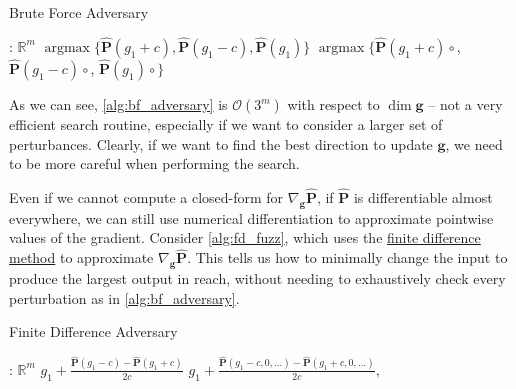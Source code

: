 \begin{algorithm}[H]
\caption{Brute Force Adversary}
\label{alg:bf_adversary}
\begin{algorithmic}[1]
: $\mathbb{R}^m$
 
\State \Return $\operatorname{argmax}\{\mathbf{\hat P}(g_1 + c), \mathbf{\hat P}(g_1 - c), \mathbf{\hat P}(g_1)\}$
\Else {}
\State \Return $\operatorname{argmax}\{\mathbf{\hat P}(g_1 + c) \circ$,\newline
\hspace*{10em} $\mathbf{\hat P}(g_1 - c)\circ$,\newline
\hspace*{10em} $\mathbf{\hat P}(g_1)\circ$$\}$
\EndIf
\EndProcedure
\end{algorithmic}
\end{algorithm}

As we can see, \autoref{alg:bf_adversary} is $\mathcal{O}(3^m)$ with respect to $\dim \mathbf g$ -- not a very efficient search routine, especially if we want to consider a larger set of perturbances. Clearly, if we want to find the best direction to update $\mathbf g$, we need to be more careful when performing the search.

Even if we cannot compute a closed-form for $\nabla_{\mathbf g}\mathbf{\hat P}$, if $\mathbf{\hat P}$ is differentiable almost everywhere, we can still use numerical differentiation to approximate pointwise values of the gradient. Consider \autoref{alg:fd_fuzz}, which uses the \hyperref[sec:fdm]{finite difference method} to approximate $\nabla_{\mathbf g}\mathbf{\hat P}$. This tells us how to minimally change the input to produce the largest output in reach, without needing to exhaustively check every perturbation as in \autoref{alg:bf_adversary}.

\begin{algorithm}[H]
\caption{Finite Difference Adversary}
\label{alg:fd_fuzz}
\begin{algorithmic}[1]
: $\mathbb{R}^m$
 
\State \Return $g_1 + \frac{\mathbf{\hat P}(g_1 - c) - \mathbf{\hat P}(g_1 + c)}{2c}$
\Else {}
\State \Return $g_1 + \frac{\mathbf{\hat P}(g_1 - c, 0, \ldots) - \mathbf{\hat P}(g_1 + c, 0, \ldots)}{2c}$, 
\EndIf
\EndProcedure
\end{algorithmic}
\end{algorithm}

